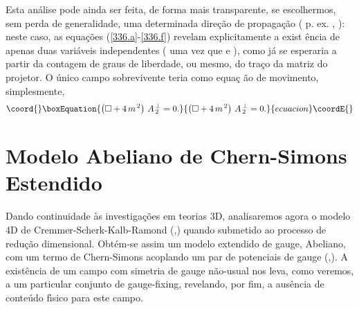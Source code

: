 \documentclass[a4paper,thmsa,12pt]{report}
\begin{document}
Esta an\'{a}lise  pode ainda ser feita, de forma mais transparente, se
escolhermos, sem perda de generalidade, uma determinada dire\c{c}\~{a}o de
propaga\c{c}\~{a}o ( p. ex. , \coordHE{}): neste caso, as
equa\c{c}\~{o}es (\ref{336.a}-\ref{336.f}) revelam explicitamente a exist%
\^{e}ncia de apenas duas vari\'{a}veis independentes ( uma vez que \coordHE{} e \coordHE{}), como j\'{a} se
esperaria a partir da contagem de graus de liberdade, ou mesmo, do tra\c{c}o
da matriz do projetor. O \'{u}nico campo sobrevivente teria como equa\c{c}%
\~{a}o de movimento, simplesmente, 
\begin{equation}\coord{}\boxEquation{
\left( \square +4\,m^{\,2}\right) \,A_{\,2}^{\,\perp }=0.  \label{343}
}{
\left( \square +4\,m^{\,2}\right) \,A_{\,2}^{\,\perp }=0.  }{ecuacion}\coordE{}\end{equation}

\section{\sc Modelo Abeliano de Chern-Simons Estendido}

Dando continuidade \`{a}s investiga\c{c}\~{o}es em teorias 3D, analisaremos
agora o modelo 4D de Cremmer-Scherk-Kalb-Ramond (\cite{kr},\cite{cs}) quando
submetido ao processo de redu\c{c}\~{a}o dimensional. Obt\'{e}m-se assim um
modelo extendido de gauge, Abeliano, com um termo de Chern-Simons acoplando
um par de potenciais de gauge (\cite{cchmn1},\cite{cchmn2}). A
exist\^{e}ncia de um campo com simetria de gauge n\~{a}o-usual nos leva,
como veremos, a um particular conjunto de gauge-fixing, revelando, por fim,
a aus\^{e}ncia de conte\'{u}do f\'{\i}sico para este campo\cite{alvaro}.
\end{document}

